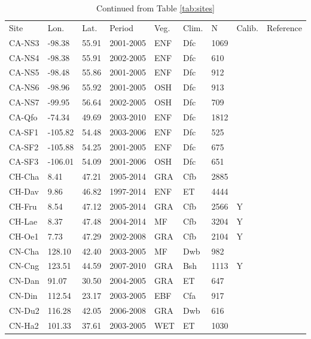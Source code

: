 \documentclass[gmd, manuscript]{copernicus}
\begin{document}
\begin{table}[t]
\caption{Continued from Table \ref{tab:sites}} 
\begin{tabular}{lllllllll}
  \tophline
  Site & Lon. & Lat. & Period & Veg. & Clim. & N & Calib. & Reference \\ 
  \middlehline  
  CA-NS3 & -98.38 & 55.91 & 2001-2005 & ENF & Dfc & 1069 &  & \citet{CA-NS3} \\ 
  CA-NS4 & -98.38 & 55.91 & 2002-2005 & ENF & Dfc & 610 &  & \citet{CA-NS4} \\ 
  CA-NS5 & -98.48 & 55.86 & 2001-2005 & ENF & Dfc & 912 &  & \citet{CA-NS5} \\ 
  CA-NS6 & -98.96 & 55.92 & 2001-2005 & OSH & Dfc & 913 &  & \citet{CA-NS6} \\ 
  CA-NS7 & -99.95 & 56.64 & 2002-2005 & OSH & Dfc & 709 &  & \citet{CA-NS7} \\ 
  CA-Qfo & -74.34 & 49.69 & 2003-2010 & ENF & Dfc & 1812 &  & \citet{CA-Qfo} \\ 
  CA-SF1 & -105.82 & 54.48 & 2003-2006 & ENF & Dfc & 525 &  & \citet{CA-SF1} \\ 
  CA-SF2 & -105.88 & 54.25 & 2001-2005 & ENF & Dfc & 675 &  & \citet{CA-SF2} \\ 
  CA-SF3 & -106.01 & 54.09 & 2001-2006 & OSH & Dfc & 651 &  & \citet{CA-SF3} \\ 
  CH-Cha & 8.41 & 47.21 & 2005-2014 & GRA & Cfb & 2885 &  & \citet{CH-Cha} \\ 
  CH-Dav & 9.86 & 46.82 & 1997-2014 & ENF & ET & 4444 &  & \citet{CH-Dav} \\ 
  CH-Fru & 8.54 & 47.12 & 2005-2014 & GRA & Cfb & 2566 & Y & \citet{CH-Fru} \\ 
  CH-Lae & 8.37 & 47.48 & 2004-2014 & MF & Cfb & 3204 & Y & \citet{CH-Lae} \\ 
  CH-Oe1 & 7.73 & 47.29 & 2002-2008 & GRA & Cfb & 2104 & Y & \citet{CH-Oe1} \\ 
  CN-Cha & 128.10 & 42.40 & 2003-2005 & MF & Dwb & 982 &  & \citet{CN-Cha} \\ 
  CN-Cng & 123.51 & 44.59 & 2007-2010 & GRA & Bsh & 1113 & Y & \citet{CN-Cng} \\ 
  CN-Dan & 91.07 & 30.50 & 2004-2005 & GRA & ET & 647 &  & \citet{CN-Dan} \\ 
  CN-Din & 112.54 & 23.17 & 2003-2005 & EBF & Cfa & 917 &  & \citet{CN-Din} \\ 
  CN-Du2 & 116.28 & 42.05 & 2006-2008 & GRA & Dwb & 616 &  & \citet{CN-Du2} \\ 
  CN-Ha2 & 101.33 & 37.61 & 2003-2005 & WET & ET & 1030 &  & \citet{CN-Ha2} \\ 

\end{tabular}
\end{table}
\end{document}
